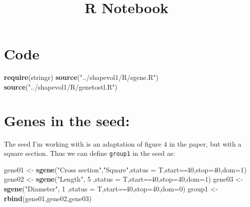 \documentclass[]{article}
\title{R Notebook}
\author{}
\date{}
\newenvironment{Shaded}{\begin{snugshade}}{\end{snugshade}}
\newcommand{\DataTypeTok}[1]{\textcolor[rgb]{0.13,0.29,0.53}{#1}}
\newcommand{\DecValTok}[1]{\textcolor[rgb]{0.00,0.00,0.81}{#1}}
\newcommand{\KeywordTok}[1]{\textcolor[rgb]{0.13,0.29,0.53}{\textbf{#1}}}
\newcommand{\NormalTok}[1]{#1}
\newcommand{\OperatorTok}[1]{\textcolor[rgb]{0.81,0.36,0.00}{\textbf{#1}}}
\newcommand{\StringTok}[1]{\textcolor[rgb]{0.31,0.60,0.02}{#1}}
\begin{document}
\maketitle

\hypertarget{code}{%
\section{Code}\label{code}}

\begin{Shaded}
\begin{Highlighting}[]
\KeywordTok{require}\NormalTok{(stringr)}
\KeywordTok{source}\NormalTok{(}\StringTok{"../shapevol1/R/sgene.R"}\NormalTok{)}
\KeywordTok{source}\NormalTok{(}\StringTok{"../shapevol1/R/genetostl.R"}\NormalTok{)}
\end{Highlighting}
\end{Shaded}

\hypertarget{genes-in-the-seed}{%
\section{Genes in the seed:}\label{genes-in-the-seed}}

The seed I'm working with is an adaptation of figure 4 in the paper, but
with a square section. Thus we can define \texttt{group1} in the seed
as:

\begin{Shaded}
\begin{Highlighting}[]
\NormalTok{gene01 <-}\StringTok{ }\KeywordTok{sgene}\NormalTok{(}\StringTok{"Cross section"}\NormalTok{,}\StringTok{"Square"}\NormalTok{,}\DataTypeTok{status =}\NormalTok{ T,}\DataTypeTok{start=}\OperatorTok{-}\DecValTok{40}\NormalTok{,}\DataTypeTok{stop=}\DecValTok{40}\NormalTok{,}\DataTypeTok{dom=}\DecValTok{1}\NormalTok{)}
\NormalTok{gene02 <-}\StringTok{ }\KeywordTok{sgene}\NormalTok{(}\StringTok{"Length"}\NormalTok{,       }\DecValTok{5}\NormalTok{       ,}\DataTypeTok{status =}\NormalTok{ T,}\DataTypeTok{start=}\OperatorTok{-}\DecValTok{40}\NormalTok{,}\DataTypeTok{stop=}\DecValTok{40}\NormalTok{,}\DataTypeTok{dom=}\DecValTok{1}\NormalTok{)}
\NormalTok{gene03 <-}\StringTok{ }\KeywordTok{sgene}\NormalTok{(}\StringTok{"Diameter"}\NormalTok{,     }\DecValTok{1}\NormalTok{       ,}\DataTypeTok{status =}\NormalTok{ T,}\DataTypeTok{start=}\OperatorTok{-}\DecValTok{40}\NormalTok{,}\DataTypeTok{stop=}\DecValTok{40}\NormalTok{,}\DataTypeTok{dom=}\DecValTok{0}\NormalTok{)}
\NormalTok{group1 <-}\StringTok{ }\KeywordTok{rbind}\NormalTok{(gene01,gene02,gene03)}
\end{Highlighting}
\end{Shaded}
\end{document}
